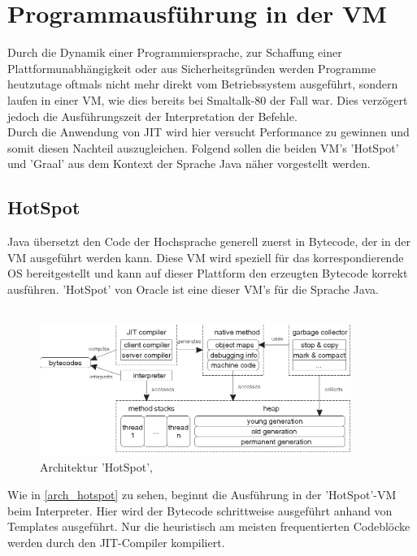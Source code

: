 \section{Programmausführung in der VM} \label{jit_vm}
Durch die Dynamik einer Programmiersprache, zur Schaffung einer Plattformunabhängigkeit oder aus Sicherheitsgründen werden Programme heutzutage oftmals nicht mehr direkt vom Betriebssystem ausgeführt, sondern laufen in einer \ac{VM}, wie dies bereits bei Smaltalk-80 der Fall war. Dies verzögert jedoch die Ausführungszeit der Interpretation der Befehle. \\
Durch die Anwendung von \ac{JIT} wird hier versucht Performance zu gewinnen und somit diesen Nachteil auszugleichen. Folgend sollen die beiden \ac{VM}'s 'HotSpot' und 'Graal' aus dem Kontext der Sprache Java näher vorgestellt werden. 
\subsection{HotSpot}
Java übersetzt den Code der Hochsprache generell zuerst in Bytecode, der in der \ac{VM} ausgeführt werden kann. Diese \ac{VM} wird speziell für das korrespondierende \ac{OS} bereitgestellt und kann auf dieser Plattform den erzeugten Bytecode korrekt ausführen. 'HotSpot' von Oracle ist eine dieser \ac{VM}'s für die Sprache Java. \\
\\
\begin{figure}[ht]
    \begin{center}
        \includegraphics[width=0.9\textwidth]{assets/img/3-Figure1-1.png}
        \caption{Architektur 'HotSpot', \cite[Quelle: Kotzmann Wimmer 2008]{KotzmannWimmer2008}}
        \label{arch_hotspot}
    \end{center}
\end{figure}
Wie in \autoref{arch_hotspot} zu sehen, beginnt die Ausführung in der 'HotSpot'-\ac{VM} beim Interpreter. Hier wird der Bytecode schrittweise ausgeführt anhand von Templates ausgeführt. Nur die heuristisch am meisten frequentierten Codeblöcke werden durch den \ac{JIT}-Compiler kompiliert.\\
